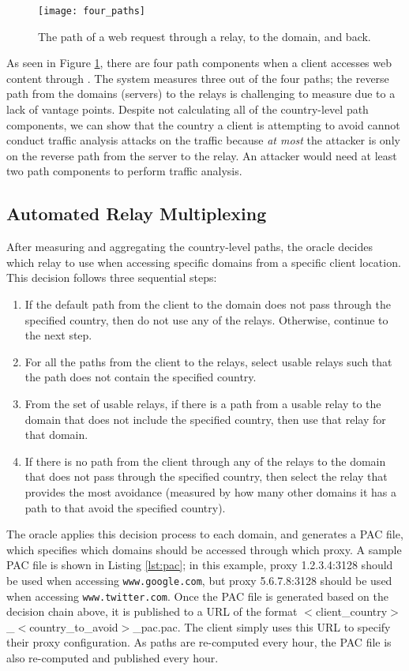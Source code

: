 \begin{figure}[t]
\centering
\texttt{[image: four\_paths]}
\caption{The path of a web request through a \system{} relay, to the domain, and back.}
\label{fig:path_components}
\end{figure}

As seen in Figure \ref{fig:path_components}, there are four path components 
when a client accesses web content through \system{}.  The system measures three 
out of the four paths; the reverse path from the domains (servers) to the relays 
is challenging to measure due to a lack of vantage points.  Despite not 
calculating all of the country-level path components, we can show that the 
country a client is attempting to avoid cannot conduct traffic analysis attacks 
on the traffic because {\it at most} the attacker is only on the reverse path 
from the server to the relay.  An attacker would need at least two path 
components to perform traffic analysis. 

\subsection{Automated Relay Multiplexing}
\label{multiplex}
After measuring and aggregating the country-level paths, the oracle decides 
which relay to use when accessing specific domains from a specific client 
location.  This decision follows three sequential steps:

\begin{enumerate}
\item If the default path from the client to the domain does not pass through 
the specified country, then do not use any of the relays. Otherwise, continue 
to the next step.
\item For all the paths from the client to the relays, select usable relays 
such that the path does not contain the specified country.
\item From the set of usable relays, if there is a path from a 
usable relay to the domain that does not include the specified country, then 
use that relay for that domain.
\item If there is no path from the client through any of the relays to the domain 
that does not pass through the specified country, then select the relay 
that provides the most avoidance (measured by how many other domains it has 
a path to that avoid the specified country).
\end{enumerate}

The oracle applies this decision process to each domain, and generates a PAC 
file, which specifies which domains should be accessed through which proxy.  A 
sample PAC file is shown in Listing \ref{lst:pac}; in this example, proxy 
1.2.3.4:3128 should be used when accessing {\tt www.google.com}, but proxy 
5.6.7.8:3128 should be used when accessing {\tt www.twitter.com}.  Once the PAC 
file is generated based on the decision chain above, it is published to a URL 
of the format $<$client\_country$>$\_$<$country\_to\_avoid$>$\_pac.pac.  The client 
simply uses this URL to specify their proxy configuration.  As paths are re-computed 
every hour, the PAC file is also re-computed and published every hour.

